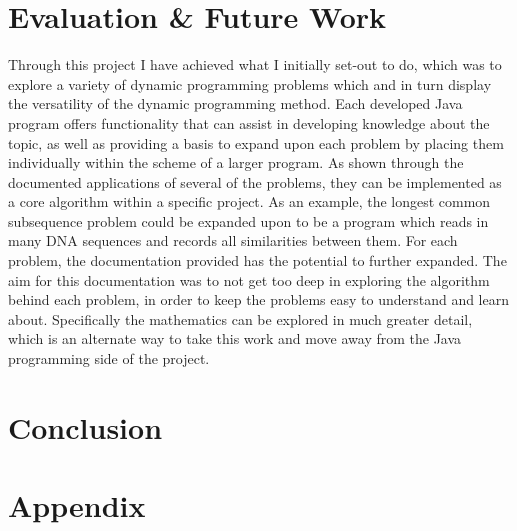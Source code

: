 \section{Evaluation \& Future Work}
Through this project I have achieved what I initially set-out to do, which was to explore a variety of dynamic programming problems which and in turn display the versatility of the dynamic programming method. Each developed Java program offers functionality that can assist in developing knowledge about the topic, as well as providing a basis to expand upon each problem by placing them individually within the scheme of a larger program. As shown through the documented applications of several of the problems, they can be implemented as a core algorithm within a specific project. As an example, the longest common subsequence problem could be expanded upon to be a program which reads in many DNA sequences and records all similarities between them.
\smallbreak
For each problem, the documentation provided has the potential to further expanded. The aim for this documentation was to not get too deep in exploring the algorithm behind each problem, in order to keep the problems easy to understand and learn about. Specifically the mathematics can be explored in much greater detail, which is an alternate way to take this work and move away from the Java programming side of the project.
\smallbreak

\section{Conclusion}

\section{Appendix}
